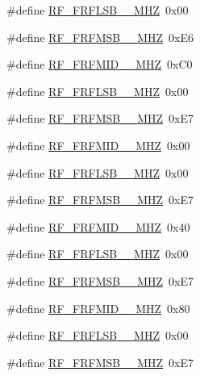 \begin{DoxyCompactItemize}
\item 
\#define \mbox{\hyperlink{sx1276_regs-_fsk_8h_ad25234b1263e37abda8f6cc585c939ca}{R\+F\+\_\+\+F\+R\+F\+L\+S\+B\+\_\+\_\+\+M\+HZ}}~0x00
\item 
\#define \mbox{\hyperlink{sx1276_regs-_fsk_8h_aa6e42390611123d77589fc770058555c}{R\+F\+\_\+\+F\+R\+F\+M\+S\+B\+\_\+\_\+\+M\+HZ}}~0x\+E6
\item 
\#define \mbox{\hyperlink{sx1276_regs-_fsk_8h_a90947d1a0f48c89486946fffe628ff78}{R\+F\+\_\+\+F\+R\+F\+M\+I\+D\+\_\+\_\+\+M\+HZ}}~0x\+C0
\item 
\#define \mbox{\hyperlink{sx1276_regs-_fsk_8h_a347e6771a94a6176cc90415848828eb1}{R\+F\+\_\+\+F\+R\+F\+L\+S\+B\+\_\+\_\+\+M\+HZ}}~0x00
\item 
\#define \mbox{\hyperlink{sx1276_regs-_fsk_8h_ad8aba952c014e2c08340d73f404f3072}{R\+F\+\_\+\+F\+R\+F\+M\+S\+B\+\_\+\_\+\+M\+HZ}}~0x\+E7
\item 
\#define \mbox{\hyperlink{sx1276_regs-_fsk_8h_ad9f0fa1a4f699e3fa4e6095c50423f20}{R\+F\+\_\+\+F\+R\+F\+M\+I\+D\+\_\+\_\+\+M\+HZ}}~0x00
\item 
\#define \mbox{\hyperlink{sx1276_regs-_fsk_8h_a0121ab508575ecf2f3af83b4affe913d}{R\+F\+\_\+\+F\+R\+F\+L\+S\+B\+\_\+\_\+\+M\+HZ}}~0x00
\item 
\#define \mbox{\hyperlink{sx1276_regs-_fsk_8h_a9317e75c46b2888c847f5d5560fc4295}{R\+F\+\_\+\+F\+R\+F\+M\+S\+B\+\_\+\_\+\+M\+HZ}}~0x\+E7
\item 
\#define \mbox{\hyperlink{sx1276_regs-_fsk_8h_ad764821102179c03fa856b0068bce2c1}{R\+F\+\_\+\+F\+R\+F\+M\+I\+D\+\_\+\_\+\+M\+HZ}}~0x40
\item 
\#define \mbox{\hyperlink{sx1276_regs-_fsk_8h_ac2d3a6fb3a8d88975487b7c811bbd99c}{R\+F\+\_\+\+F\+R\+F\+L\+S\+B\+\_\+\_\+\+M\+HZ}}~0x00
\item 
\#define \mbox{\hyperlink{sx1276_regs-_fsk_8h_a65a33036761574a1a055363a12432579}{R\+F\+\_\+\+F\+R\+F\+M\+S\+B\+\_\+\_\+\+M\+HZ}}~0x\+E7
\item 
\#define \mbox{\hyperlink{sx1276_regs-_fsk_8h_a1b35ddffb5369efd6a34ded63724ceab}{R\+F\+\_\+\+F\+R\+F\+M\+I\+D\+\_\+\_\+\+M\+HZ}}~0x80
\item 
\#define \mbox{\hyperlink{sx1276_regs-_fsk_8h_ac664acd9a4e7749794f8a533a05436a1}{R\+F\+\_\+\+F\+R\+F\+L\+S\+B\+\_\+\_\+\+M\+HZ}}~0x00
\item 
\#define \mbox{\hyperlink{sx1276_regs-_fsk_8h_a038d10c481806a8f4f5165d91019ce50}{R\+F\+\_\+\+F\+R\+F\+M\+S\+B\+\_\+\_\+\+M\+HZ}}~0x\+E7

\end{DoxyCompactItemize}
